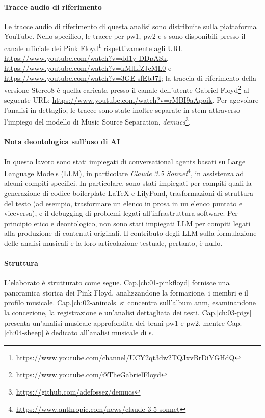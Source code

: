 \documentclass[class=book, crop=false, oneside, 12pt]{standalone}
\begin{document}
\paragraph{Tracce audio di riferimento}
Le tracce audio di riferimento di questa analisi sono distribuite sulla piattaforma YouTube. Nello specifico, le tracce per \acrshort{pw1}, \acrshort{pw2} e \acrshort{s} sono disponibili  presso il canale ufficiale dei Pink Floyd\footnote{\url{https://www.youtube.com/channel/UCY2qt3dw2TQJxvBrDiYGHdQ}} rispettivamente agli URL \url{https://www.youtube.com/watch?v=dd1y-DDpASk}, \url{https://www.youtube.com/watch?v=kMlLfZJcML0} e \url{https://www.youtube.com/watch?v=3GE-sfEbJ7I};  la traccia di riferimento della versione Stereo8 è quella caricata presso il canale dell'utente Gabriel Floyd\footnote{\url{https://www.youtube.com/@TheGabrielFloyd}} al seguente URL: \url{https://www.youtube.com/watch?v=rMBI9aApoik}. Per agevolare l'analisi in dettaglio, le tracce sono state inoltre separate in stem attraverso l'impiego del modello di Music Source Separation, \emph{demucs}\footnote{\url{https://github.com/adefossez/demucs}}.

\paragraph{Nota deontologica sull'uso di AI}
In questo lavoro sono stati impiegati di conversational agents basati su Large Language Models (LLM), in particolare \emph{Claude 3.5 Sonnet}\footnote{\url{https://www.anthropic.com/news/claude-3-5-sonnet}}, in assistenza ad alcuni compiti specifici. In particolare, sono stati impiegati per compiti quali la generazione di codice boilerplate LaTeX e LilyPond, trasformazioni di struttura del testo (ad esempio, trasformare un elenco in prosa in un elenco puntato e viceversa), e il debugging di problemi legati all'infrastruttura software. Per principio etico e deontologico, non sono stati impiegati LLM per compiti legati alla produzione di contenuti originali. Il contributo degli LLM sulla formulazione delle analisi musicali e la loro articolazione testuale, pertanto, è nullo.

\paragraph{Struttura}
L'elaborato è strutturato come segue. Cap.\ref{ch:01-pinkfloyd} fornisce una panoramica storica dei Pink Floyd, analizzandone la formazione, i membri e il profilo musicale. Cap.\ref{ch:02-animals} si concentra sull'album \acrlong{anm}, esaminandone la concezione, la registrazione e un'analisi dettagliata dei testi. Cap.\ref{ch:03-pigs} presenta un'analisi musicale approfondita dei brani \acrlong{pw1} e \acrlong{pw2}, mentre Cap.\ref{ch:04-sheep} è dedicato all'analisi musicale di \acrlong{s}.
\end{document}
